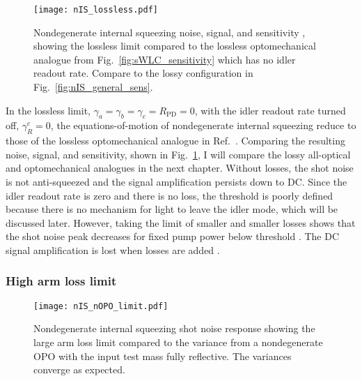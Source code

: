 \begin{figure}
	\centering
	\texttt{[image: nIS\_lossless.pdf]}
	\caption{  Nondegenerate internal squeezing noise, signal, and sensitivity , showing the lossless limit compared to the lossless optomechanical analogue from Fig.~\ref{fig:sWLC_sensitivity} which has no idler readout rate.  Compare to the lossy configuration in Fig.~\ref{fig:nIS_general_sens}.}
	\label{fig:nIS_lossless}
\end{figure}

In the lossless limit, $\gamma_a=\gamma_b=\gamma_c=R_\text{PD}=0$, with the idler readout rate turned off, $\gamma^c_R=0$, the equations-of-motion of nondegenerate internal squeezing reduce to those of the lossless optomechanical analogue in Ref.~\cite{Li2020}. Comparing the resulting noise, signal, and sensitivity, shown in Fig.~\ref{fig:nIS_lossless}, 
I will compare the lossy all-optical and optomechanical analogues in the next chapter. 
Without losses, the shot noise is not anti-squeezed and the signal amplification persists down to DC. Since the idler readout rate is zero and there is no loss, the threshold is poorly defined because there is no mechanism for light to leave the idler mode, which will be discussed later. However, taking the limit of smaller and smaller losses shows that the shot noise peak decreases for fixed pump power below threshold . The DC signal amplification is lost when losses are added .


\subsubsection{High arm loss limit}
\label{sec:nOPO_reduction}

\begin{figure}
	\centering
	\texttt{[image: nIS\_nOPO\_limit.pdf]}
	\caption{  Nondegenerate internal squeezing shot noise response showing the large arm loss limit compared to the variance from a nondegenerate OPO with the input test mass fully reflective. The variances converge as expected.}
	\label{fig:nIS_signal_nOPO_limit}
\end{figure}

